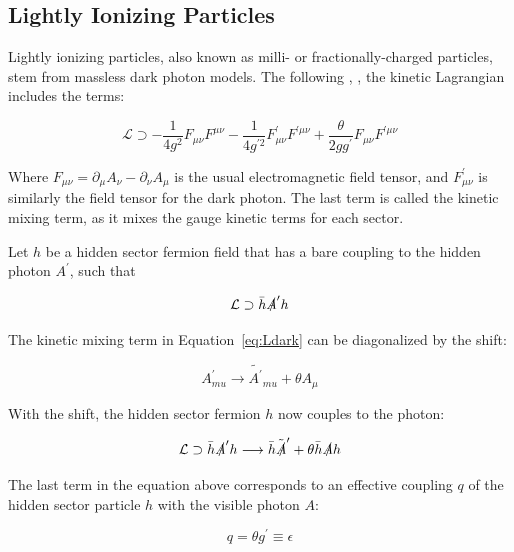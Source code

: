 \subsection{Lightly Ionizing Particles}
Lightly ionizing particles, also known as milli- or fractionally-charged particles, stem from massless dark photon models. The following \cite{Holdom1986}, \cite{Abel2008}, the kinetic Lagrangian includes the terms:

\begin{equation}
\label{eq:Ldark}
\mathcal{L} \supset -\frac{1}{4g^{2}}F_{\mu\nu}F^{\mu\nu} - \frac{1}{4g^{\prime2}}F^{\prime}_{\mu\nu}F^{\prime \mu\nu} + \frac{\theta}{2gg^{\prime}} F_{\mu\nu}F^{\prime \mu\nu}
\end{equation}

Where $F_{\mu\nu} = \partial_{\mu}A_{\nu} - \partial_{\nu}A_{\mu}$ is the usual electromagnetic field tensor, and $F^{\prime}_{\mu\nu}$ is similarly the field tensor for the dark photon. The last term is called the kinetic mixing term, as it mixes the gauge kinetic terms for each sector. 

Let $h$ be a hidden sector fermion field that has a bare coupling to the hidden photon $A^{\prime}$, such that

\begin{equation}
\mathcal{L} \supset \bar{h}\slashed{A}^{\prime} h 
\end{equation}

The kinetic mixing term in Equation~\ref{eq:Ldark} can be diagonalized by the shift:

\begin{equation}
A^{\prime}_{mu} \longrightarrow \tilde{A^{\prime}}_{mu} + \theta A_{\mu}
\end{equation}

With the shift, the hidden sector fermion $h$ now couples to the photon:

\begin{equation}
\mathcal{L} \supset \bar{h}\slashed{A}^{\prime} h \longrightarrow  \bar{h}\tilde{\slashed{A}}^{\prime} + \theta \bar{h} \slashed{A} h
\end{equation}

The last term in the equation above corresponds to an effective coupling $q$ of the hidden sector particle $h$ with the visible photon $A$: 

\begin{equation}
q = \theta g^{\prime} \equiv \epsilon
\end{equation}

